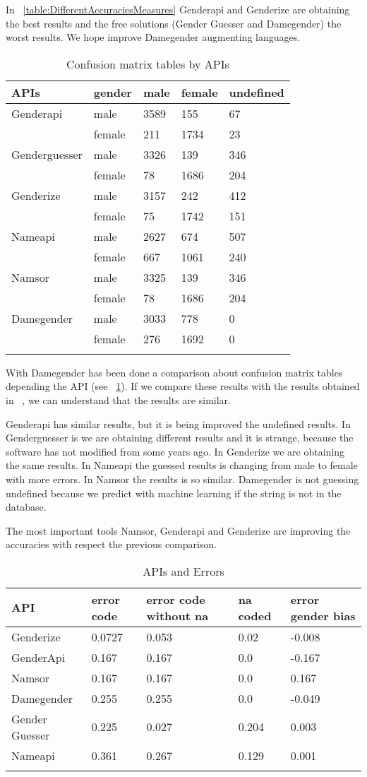 \documentclass[fleqn,10pt,lineno]{wlpeerj} %
\begin{document}
In ~\ref{table:DifferentAccuraciesMeasures} Genderapi and Genderize
are obtaining the best results and the free solutions (Gender Guesser
and Damegender) the worst results. We hope improve Damegender
augmenting languages.

\begin{longtable}[]{@{}lllll@{}}
  \toprule
  APIs        &  gender  &  male   &  female  & undefined \tabularnewline
\midrule
\endhead
Genderapi     & male    & 3589 & 155  &  67 \tabularnewline
              & female  & 211  & 1734 &  23  \tabularnewline
Genderguesser & male    & 3326 &  139  & 346  \tabularnewline
              & female  & 78  & 1686 &  204 \tabularnewline
Genderize     & male    & 3157 & 242  & 412 \tabularnewline
              & female  & 75   & 1742 &  151 \tabularnewline
Nameapi       & male    & 2627 & 674  & 507  \tabularnewline
              & female  & 667  & 1061 &  240  \tabularnewline
Namsor        & male    & 3325 & 139  & 346  \tabularnewline
              & female  & 78   & 1686 &  204  \tabularnewline
Damegender    & male    & 3033 & 778  &   0 \tabularnewline
              & female  & 276  & 1692 &    0 \tabularnewline
\bottomrule
\caption{Confusion matrix tables by APIs}
\label{table:ConfusionMatrixTables}
\end{longtable}

With Damegender has been done a comparison about confusion matrix
tables depending the API (see ~\ref{table:ConfusionMatrixTables}). If
we compare these results with the results obtained in
~\cite{10.7717/peerj-cs.156}, we can understand that the results are
similar.

Genderapi has similar results, but it is being improved the undefined
results. In Genderguesser is we are obtaining different results and it
is strange, because the software has not modified from some years
ago. In Genderize we are obtaining the same results. In Nameapi the
guessed results is changing from male to female with more errors. In
Namsor the results is so similar. Damegender is not guessing undefined
because we predict with machine learning if the string is not in the
database.

The most important tools Namsor, Genderapi and Genderize are improving the
accuracies with respect the previous comparison.

\begin{longtable}[]{@{}lllll@{}}
\toprule
API & error code & error code without na & na coded & error gender bias\tabularnewline
\midrule
\endhead
Genderize & 0.0727 & 0.053 & 0.02 & -0.008\tabularnewline
GenderApi & 0.167 & 0.167 & 0.0 & -0.167\tabularnewline
Namsor & 0.167 & 0.167 & 0.0 & 0.167\tabularnewline
Damegender & 0.255 & 0.255 & 0.0 & -0.049\tabularnewline
Gender Guesser & 0.225 & 0.027 & 0.204 & 0.003\tabularnewline
Nameapi & 0.361 & 0.267 & 0.129 & 0.001 \tabularnewline
\bottomrule
\caption{APIs and Errors}
\label{table:ApisAndErrors}
\end{longtable}
\end{document}
